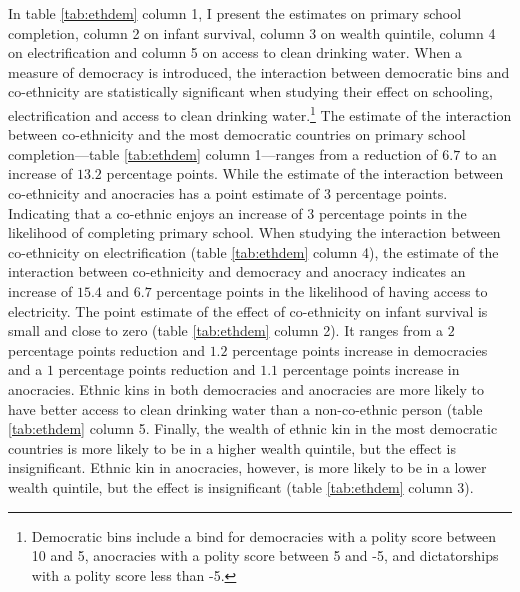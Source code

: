 \documentclass{wptemp}
\begin{document}


In table \ref{tab:ethdem} column 1, I present the estimates on primary school completion, column 2 on infant survival, column 3 on wealth quintile, column 4 on electrification and column 5 on access to clean drinking water. When a measure of democracy is introduced, the interaction between democratic bins and co-ethnicity are statistically significant when studying their effect on schooling, electrification and access to clean drinking water.\footnote{Democratic bins include a bind for democracies with a polity score between 10 and 5, anocracies with a polity score between 5 and -5, and dictatorships with a polity score less than -5.} The estimate of the interaction between co-ethnicity and the most democratic countries on primary school completion---table \ref{tab:ethdem} column 1---ranges from a reduction of $6.7$ to an increase of $13.2$ percentage points. While the estimate of the interaction between co-ethnicity and anocracies has a point estimate of $3$ percentage points. Indicating that a co-ethnic enjoys an increase of $3$ percentage points in the likelihood of completing primary school. When studying the interaction between co-ethnicity on electrification (table \ref{tab:ethdem} column 4), the estimate of the interaction between co-ethnicity and democracy and anocracy indicates an increase of $15.4$ and $6.7$ percentage points in the likelihood of having access to electricity. The point estimate of the effect of co-ethnicity on infant survival is small and close to zero (table \ref{tab:ethdem} column 2). It ranges from a $2$ percentage points reduction and $1.2$ percentage points increase in democracies and a $1$ percentage points reduction and $1.1$ percentage points increase in anocracies. Ethnic kins in both democracies and anocracies are more likely to have better access to clean drinking water than a non-co-ethnic person (table \ref{tab:ethdem} column 5. Finally, the wealth of ethnic kin in the most democratic countries is more likely to be in a higher wealth quintile, but the effect is insignificant. Ethnic kin in anocracies, however, is more likely to be in a lower wealth quintile, but the effect is insignificant (table \ref{tab:ethdem} column 3). 
\end{document}
